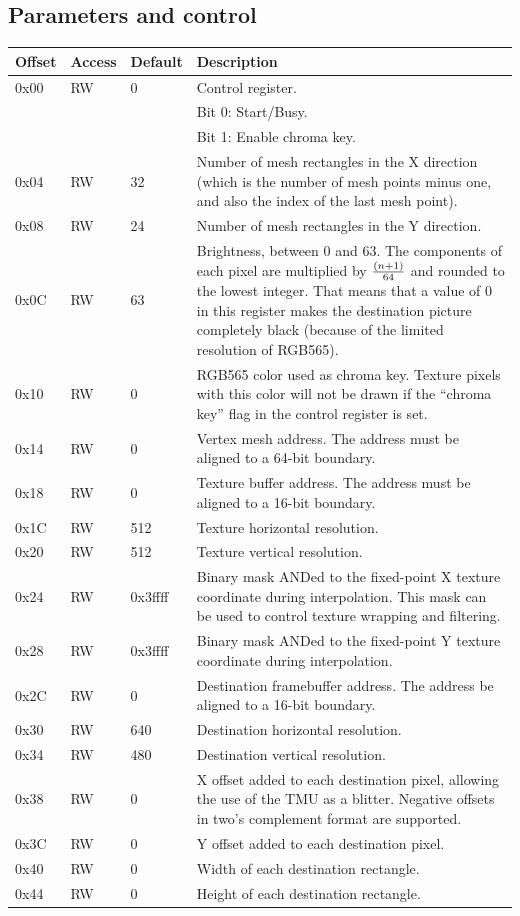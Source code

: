 \documentclass[a4paper,11pt]{article}
\begin{document}
\subsection{Parameters and control}
\begin{tabularx}{\textwidth}{|l|l|l|X|}
\hline
\bf{Offset} & \bf{Access} & \bf{Default} & \bf{Description} \\
\hline
0x00 & RW & 0 & Control register. \\
& & & Bit 0: Start/Busy.\\
& & & Bit 1: Enable chroma key. \\
\hline
0x04 & RW & 32 & Number of mesh rectangles in the X direction (which is the number of mesh points minus one, and also the index of the last mesh point). \\
\hline
0x08 & RW & 24 & Number of mesh rectangles in the Y direction. \\
\hline
0x0C & RW & 63 & Brightness, between 0 and 63. The components of each pixel are multiplied by $ (n+1) \over 64 $ and rounded to the lowest integer. That means that a value of 0 in this register makes the destination picture completely black (because of the limited resolution of RGB565). \\
\hline
0x10 & RW & 0 & RGB565 color used as chroma key. Texture pixels with this color will not be drawn if the ``chroma key'' flag in the control register is set. \\
\hline
0x14 & RW & 0 & Vertex mesh address. The address must be aligned to a 64-bit boundary. \\
\hline
0x18 & RW & 0 & Texture buffer address. The address must be aligned to a 16-bit boundary. \\
\hline
0x1C & RW & 512 & Texture horizontal resolution. \\
\hline
0x20 & RW & 512 & Texture vertical resolution. \\
\hline
0x24 & RW & 0x3ffff & Binary mask ANDed to the fixed-point X texture coordinate during interpolation. This mask can be used to control texture wrapping and filtering. \\
\hline
0x28 & RW & 0x3ffff & Binary mask ANDed to the fixed-point Y texture coordinate during interpolation. \\
\hline
0x2C & RW & 0 & Destination framebuffer address. The address be aligned to a 16-bit boundary. \\
\hline
0x30 & RW & 640 & Destination horizontal resolution. \\
\hline
0x34 & RW & 480 & Destination vertical resolution. \\
\hline
0x38 & RW & 0 & X offset added to each destination pixel, allowing the use of the TMU as a blitter. Negative offsets in two's complement format are supported. \\
\hline
0x3C & RW & 0 & Y offset added to each destination pixel. \\
\hline
0x40 & RW & 0 & Width of each destination rectangle. \\
\hline
0x44 & RW & 0 & Height of each destination rectangle. \\
\hline
\end{tabularx}
\end{document}
